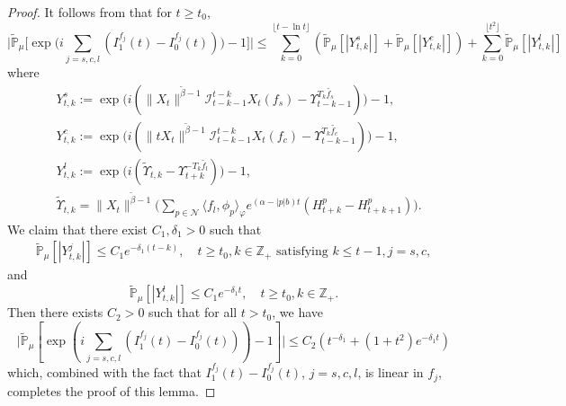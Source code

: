 \documentclass[12pt,a4paper]{amsart}
\theoremstyle{plain}
\theoremstyle{definition}
\numberwithin{equation}{section}
\begin{document}
\begin{proof}
It follows from \cite[Lemma 3.4.3]{Durrett2010Probability} that for $t\geq t_0$,
\[
\Big|\widetilde {\mathbb P}_{\mu}\Big[\exp\Big(i
\sum_{j=s,c,l}(I_{1}^{f_j}(t) - I_0^{f_j}(t))\Big)
 - 1\Big]\Big| \leq  \sum_{k=0}^{\lfloor t-\ln t \rfloor}(\widetilde {\mathbb {P}}_\mu[|Y^s_{t,k}|] + \widetilde {\mathbb {P}}_\mu[|Y^c_{t,k}|] )+ \sum_{k=0}^{\lfloor t^2 \rfloor} \widetilde {\mathbb {P}}_\mu[|Y^l_{t,k}|]
\]
 where
 \begin{align}
 &Y^s_{t,k} := \exp\Big(i(\|X_t\|^{\tilde{\beta}-1}\mathcal I_{t-k-1}^{t-k}X_t(f_s) - \Upsilon_{t-k-1}^{T_{k}\widetilde {f_s}})\Big) - 1, \\
 &Y^c_{t,k} := \exp\Big(i(\|tX_t\|^{\tilde{\beta}-1}\mathcal I_{t-k-1}^{t-k}X_t(f_c) - \Upsilon_{t-k-1}^{T_{k}\widetilde {f_c}})\Big) - 1,\\
&Y^l_{t,k} := \exp\Big(i(\widetilde{\Upsilon}_{t,k} - \Upsilon_{t+k}^{-T_{k}\widetilde {f_l}})\Big) - 1,\\
&\widetilde{\Upsilon}_{t,k}=\|X_t\|^{\tilde{\beta}-1}\Big( \sum_{p\in \mathcal N}\langle f_l,\phi_p\rangle_{\varphi}e^{(\alpha-|p|b)t}(H_{t+k}^p-H_{t+k+1}^p)\Big).
\end{align}
  We claim that there exist $C_1, \delta_1>0$ such that
\begin{align}
 \widetilde {\mathbb {P}}_\mu[|Y^j_{t,k}|]
 \leq C_1e^{-\delta_1 (t-k)}, \quad  t\geq t_0, k \in \mathbb Z_+ \text{~satisfying~} k\leq t-1,
  j=s,c,
\end{align}
and
\[
 \widetilde {\mathbb {P}}_\mu[|Y^l_{t,k}|] \leq C_1e^{-\delta_1 t}, \quad t\geq t_0, k \in \mathbb Z_+.
\]
  Then there exists $C_2>0$ such that for all $t>t_0$, we have
$$
\big|\widetilde {\mathbb P}_{\mu}\left[\exp\left(i\sum_{j=s,c,l}(I_{1}^{f_j}(t) - I_0^{f_j}(t))\right) - 1\right]\big| \leq C_2(t^{-\delta_1}+(1+t^2)e^{-\delta_1 t})
$$
which, combined with the fact that
$I^{f_j}_1(t) - I^{f_j}_0(t)$, $j=s,c,l$, is linear in $f_j$, completes the proof of this lemma.


\end{proof}
\end{document}
